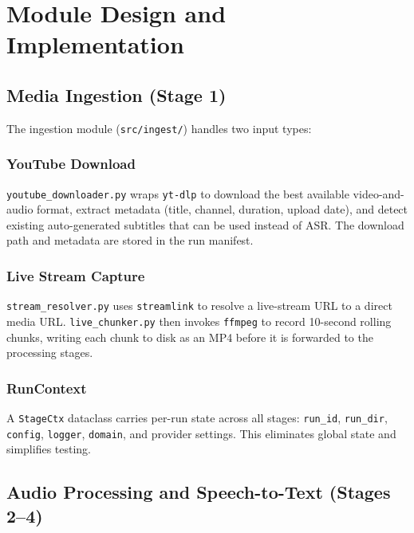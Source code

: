 \documentclass[12pt,a4paper]{article}
\begin{document}
\section{Module Design and Implementation}
\label{sec:modules}

\subsection{Media Ingestion (Stage 1)}
\label{subsec:ingest}

The ingestion module (\texttt{src/ingest/}) handles two input types:

\subsubsection{YouTube Download}
\texttt{youtube\_downloader.py} wraps \texttt{yt-dlp} to download the best available
video-and-audio format, extract metadata (title, channel, duration, upload date), and
detect existing auto-generated subtitles that can be used instead of ASR. The download
path and metadata are stored in the run manifest.

\subsubsection{Live Stream Capture}
\texttt{stream\_resolver.py} uses \texttt{streamlink} to resolve a live-stream URL to
a direct media URL. \texttt{live\_chunker.py} then invokes \texttt{ffmpeg} to record
10-second rolling chunks, writing each chunk to disk as an MP4 before it is forwarded
to the processing stages.

\subsubsection{RunContext}
A \texttt{StageCtx} dataclass carries per-run state across all stages: \texttt{run\_id},
\texttt{run\_dir}, \texttt{config}, \texttt{logger}, \texttt{domain}, and provider
settings. This eliminates global state and simplifies testing.

\subsection{Audio Processing and Speech-to-Text (Stages 2--4)}
\label{subsec:audio}
\end{document}
